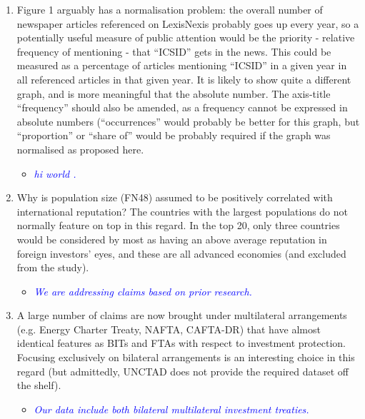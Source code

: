 \begin{enumerate}
\begin{itemize}
	\end{itemize}
	\item Figure 1 arguably has a normalisation problem: the overall number of newspaper articles referenced on LexisNexis probably goes up every year, so a potentially useful measure of public attention would be the priority - relative frequency of mentioning - that ``ICSID'' gets in the news. This could be measured as a percentage of articles mentioning ``ICSID'' in a given year in all referenced articles in that given year. It is likely to show quite a different graph, and is more meaningful that the absolute number. The axis-title ``frequency'' should also be amended, as a frequency cannot be expressed in absolute numbers (``occurrences'' would probably be better for this graph, but ``proportion'' or ``share of'' would be probably required if the graph was normalised as proposed here. 	
	\begin{itemize}
		\item \textcolor{blue}{ \emph{ hi world . }}
	\end{itemize}
	\item Why is population size (FN48) assumed to be positively correlated with international reputation? The countries with the largest populations do not normally feature on top in this regard. In the top 20, only three countries would be considered by most as having an above average reputation in foreign investors' eyes, and these are all advanced economies (and excluded from the study). 
	\begin{itemize}
		\item \textcolor{blue}{ \emph{
		We are addressing claims based on prior research.
		}}
	\end{itemize}
	\item A large number of claims are now brought under multilateral arrangements (e.g. Energy Charter Treaty, NAFTA, CAFTA-DR) that have almost identical features as BITs and FTAs with respect to investment protection. Focusing exclusively on bilateral arrangements is an interesting choice in this regard (but admittedly, UNCTAD does not provide the required dataset off the shelf). 		
	\begin{itemize}
		\item \textcolor{blue}{
		\emph{ Our data include both bilateral multilateral investment treaties.
		}}
	\end{itemize}	
\end{enumerate}
